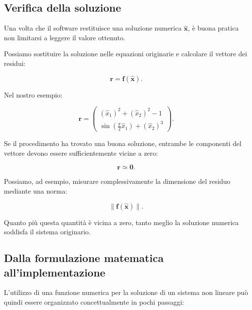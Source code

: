 \subsection{Verifica della soluzione}

Una volta che il software restituisce una soluzione numerica
$\widehat{\mathbf{x}}$, è buona pratica non limitarsi a leggere il
valore ottenuto.

Possiamo sostituire la soluzione nelle equazioni originarie e
calcolare il vettore dei residui:

\begin{equation*}
    \mathbf{r}
    =
    \mathbf{f}(\widehat{\mathbf{x}}).
\end{equation*}

Nel nostro esempio:

\begin{equation*}
\mathbf{r}
=
\begin{pmatrix}
(\widehat{x}_1)^2+(\widehat{x}_2)^2-1\\[2mm]
\displaystyle
\sin\left(
\frac{\pi}{2}\widehat{x}_1
\right)
+
(\widehat{x}_2)^3
\end{pmatrix}.
\end{equation*}

Se il procedimento ha trovato una buona soluzione, entrambe le
componenti del vettore devono essere sufficientemente vicine a zero:

\begin{equation*}
    \mathbf{r}\simeq\mathbf{0}.
\end{equation*}

Possiamo, ad esempio, misurare complessivamente la dimensione del
residuo mediante una norma:

\begin{equation*}
    \|\mathbf{f}(\widehat{\mathbf{x}})\|.
\end{equation*}

Quanto più questa quantità è vicina a zero, tanto meglio la soluzione
numerica soddisfa il sistema originario.


\subsection{Dalla formulazione matematica all'implementazione}

L'utilizzo di una funzione numerica per la soluzione di un sistema
non lineare può quindi essere organizzato concettualmente in pochi
passaggi:

